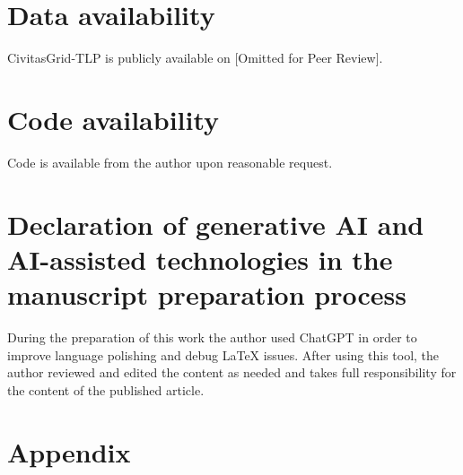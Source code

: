 \documentclass[preprint,12pt]{elsarticle}
\begin{document}
\section*{Data availability}
CivitasGrid-TLP is publicly available on [Omitted for Peer Review].

\section*{Code availability}
Code is available from the author upon reasonable request.

\section*{Declaration of generative AI and AI-assisted technologies in the manuscript preparation process}
During the preparation of this work the author used ChatGPT in order to improve language polishing and debug LaTeX issues. After using this tool, the author reviewed and edited the content as needed and takes full responsibility for the content of the published article.




\section{Appendix}
\end{document}
